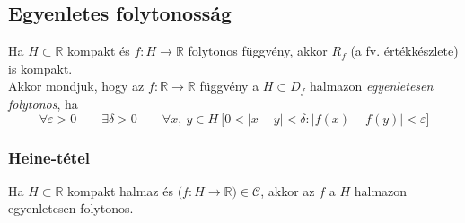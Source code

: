 \documentclass[tikz,12pt,margin=0px]{article}
\begin{document}
    \subsection*{Egyenletes folytonosság}

    \noindent Ha $H \subset \mathbb{R}$ kompakt és $f: H \to \mathbb{R}$ folytonos függvény, akkor $R_{f}$ (a fv. értékkészlete) is kompakt.\\

    \noindent Akkor mondjuk, hogy az $f : \mathbb{R} \to \mathbb{R}$ függvény a $H \subset D_{f}$ halmazon \emph{egyenletesen folytonos}, ha
    \[
        \forall \varepsilon > 0\qquad \exists \delta > 0\qquad \forall x,\ y \in H\ \Big[0 < \big|x-y\big| < \delta : \big|f(x)-f(y)\big| < \varepsilon\Big]
    \]

	\subsubsection*{Heine-tétel}
	
    Ha $H \subset \mathbb{R}$ kompakt halmaz és $\big(f: H \to \mathbb{R}\big) \in \mathcal{C}$, akkor az $f$ a $H$ halmazon egyenletesen folytonos.




\end{document}
